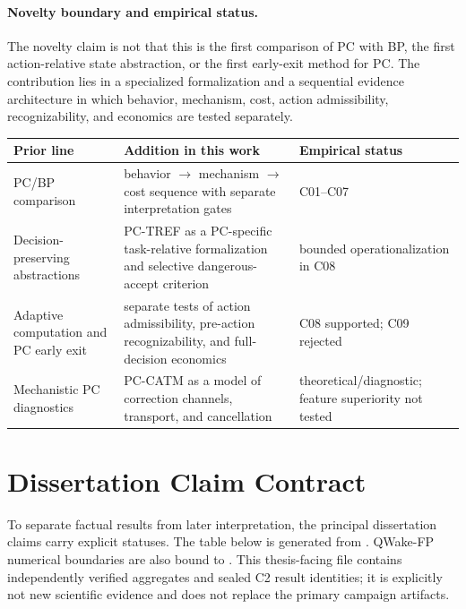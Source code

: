 \paragraph{Novelty boundary and empirical status.}
The novelty claim is not that this is the first comparison of PC with BP, the first
action-relative state abstraction, or the first early-exit method for PC. The
contribution lies in a specialized formalization and a sequential evidence architecture
in which behavior, mechanism, cost, action admissibility, recognizability, and
economics are tested separately.

\begin{center}
\small
\begin{tabular}{p{}p{}p{}}
\toprule
Prior line & Addition in this work & Empirical status \\
\midrule
PC/BP comparison & behavior $\to$ mechanism $\to$ cost sequence with separate interpretation gates & C01--C07 \\
Decision-preserving abstractions & PC-TREF as a PC-specific task-relative formalization and selective dangerous-accept criterion & bounded operationalization in C08 \\
Adaptive computation and PC early exit & separate tests of action admissibility, pre-action recognizability, and full-decision economics & C08 supported; C09 rejected \\
Mechanistic PC diagnostics & PC-CATM as a model of correction channels, transport, and cancellation & theoretical/\allowbreak diagnostic; feature superiority not tested \\
\bottomrule
\end{tabular}
\end{center}

\section{Dissertation Claim Contract}
\label{sec:intro-claims-en}

To separate factual results from later interpretation, the principal dissertation
claims carry explicit statuses. The table below is generated from
. QWake-FP numerical boundaries are also bound
to . This thesis-facing file contains
independently verified aggregates and sealed C2 result identities; it is explicitly
not new scientific evidence and does not replace the primary campaign artifacts.

